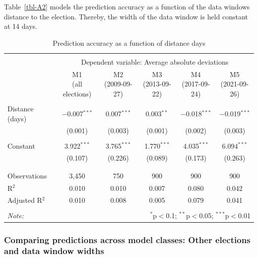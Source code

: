 \documentclass[
  letterpaper,
  DIV=11,
  numbers=noendperiod]{scrartcl}
\begin{document}
Table~\ref{tbl-A2} models the prediction accuracy as a function of the
data windows distance to the election. Thereby, the width of the data
window is held constant at 14 days.

\hypertarget{tbl-A2}{}
\begin{table}[!htbp] \centering 
  \caption{\label{tbl-A2}Prediction accuracy as a function of distance days } 
  \label{} 
\scriptsize 
\begin{tabular}{@{\extracolsep{5pt}}lccccc} 
\\[-1.8ex]\hline 
\hline \\[-1.8ex] 
 & \multicolumn{5}{c}{Dependent variable: Average absolute deviations} \\ 
\cline{2-6} 
 & \shortstack{M1 \\ (all elections)} & \shortstack{M2 \\ (2009-09-27)} & \shortstack{M3 \\ (2013-09-22)} & \shortstack{M4 \\ (2017-09-24)} & \shortstack{M5 \\ (2021-09-26)} \\ 
\hline \\[-1.8ex] 
 Distance (days) & $-$0.007$^{***}$ & 0.007$^{***}$ & 0.003$^{**}$ & $-$0.018$^{***}$ & $-$0.019$^{***}$ \\ 
  & (0.001) & (0.003) & (0.001) & (0.002) & (0.003) \\ 
  & & & & & \\ 
 Constant & 3.922$^{***}$ & 3.765$^{***}$ & 1.770$^{***}$ & 4.035$^{***}$ & 6.094$^{***}$ \\ 
  & (0.107) & (0.226) & (0.089) & (0.173) & (0.263) \\ 
  & & & & & \\ 
\hline \\[-1.8ex] 
Observations & 3,450 & 750 & 900 & 900 & 900 \\ 
R$^{2}$ & 0.010 & 0.010 & 0.007 & 0.080 & 0.042 \\ 
Adjusted R$^{2}$ & 0.010 & 0.008 & 0.005 & 0.079 & 0.041 \\ 
\hline 
\hline \\[-1.8ex] 
\textit{Note:}  & \multicolumn{5}{r}{$^{*}$p$<$0.1; $^{**}$p$<$0.05; $^{***}$p$<$0.01} \\ 
\end{tabular} 
\end{table}

\hypertarget{sec-comparing-model-classes-other}{%
\subsubsection{Comparing predictions across model classes: Other
elections and data window
widths}\label{sec-comparing-model-classes-other}}
\end{document}
